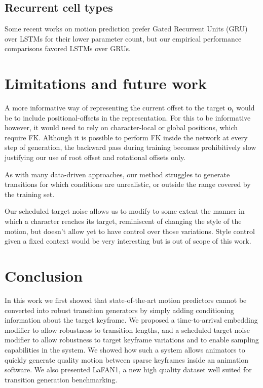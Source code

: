 \documentclass[acmtog]{acmart}
\newcommand{\bo}{\textbf{o}}
\begin{document}
\subsection{Recurrent cell types}
Some recent works on motion prediction prefer Gated Recurrent Units (GRU) over LSTMs for their lower parameter count, but our empirical performance comparisons favored LSTMs over GRUs.

\section{Limitations and future work}
A more informative way of representing the current offset to the target $\bo_t$ would be to include positional-offsets in the representation. For this to be informative however, it would need to rely on character-local or global positions, which require FK. Although it is possible to perform FK inside the network at every step of generation, the backward pass during training becomes prohibitively slow justifying our use of root offset and rotational offsets only. 

As with many data-driven approaches, our method struggles to generate transitions for which conditions are unrealistic, or outside the range covered by the training set.

Our scheduled target noise allows us to modify to some extent the manner in which a character reaches its target, reminiscent of changing the style of the motion, but doesn't allow yet to have control over those variations. Style control given a fixed context would be very interesting but is out of scope of this work.





\section{Conclusion}
In this work we first showed that state-of-the-art motion predictors cannot be converted into robust transition generators by simply adding conditioning information about the target keyframe. We proposed a time-to-arrival embedding modifier to allow robustness to transition lengths, and a scheduled target noise modifier to allow robustness to target keyframe variations and to enable sampling capabilities in the system. We showed how such a system allows animators to quickly generate quality motion between sparse keyframes inside an animation software. We also presented LaFAN1, a new high quality dataset well suited for transition generation benchmarking.
\end{document}
